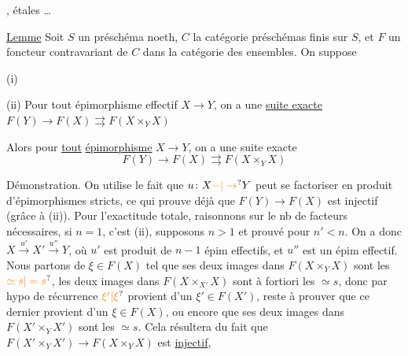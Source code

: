 
 
, étales \ldots

\uline{Lemme} Soit $S$ un préschéma  noeth, $C$ la catégorie
 préschémas finis sur $S$, et $F$ un foncteur
contravariant de $C$ dans la catégorie des ensembles. On
suppose

(i) 

\deleted{\unsure{*}} (ii) Pour tout épimorphisme effectif $X\to Y$, on a
une \uline{suite exacte} $F(Y)\to F(X)\rightrightarrows F(X\times_Y X)$

Alors pour \uline{tout} \uline{épimorphisme} $X\to Y$, on a
une suite exacte
\[
F(Y)\to F(X)\rightrightarrows F(X\times_Y X)
\]

Démonstration. On utilise le fait que $u\colon X\unsure{-|\to}Y$
peut se factoriser en produit d'épimorphismes
stricts, ce qui prouve déjà que $F(Y)\to F(X)$ est
injectif (grâce à (ii)). Pour l'exactitude totale, raisonnons
sur le nb de facteurs nécessaires, si $n=1$,
c'est (ii), supposons $n>1$ et prouvé pour $n'<n$.
On a donc $X\xrightarrow{u'}X'\xrightarrow{u''}Y$, où $u'$ est produit
de $n-1$ épim effectifs, et $u''$ est un épim
effectif. Nous  partons de $\xi\in F(X)$ tel que
ses deux images dans $F(X\times_Y X)$ sont
les $\unsure{\simeq s|=s}$, les deux images dans
$F(X\times_{X'}X)$ sont à fortiori les $\simeq s$,
donc par hypo de récurrence $\unsure{\xi'|\xi}$ provient
d'un $\xi'\in F(X')$, reste à prouver que ce
dernier provient d'un $\xi\in F(X)$, ou encore que
ses deux images dans $F(X'\times_Y X')$ sont les $\simeq s$. Cela
résultera du fait que $F(X'\times_Y X')\to F(X\times_Y X)$ est \uline{injectif},


